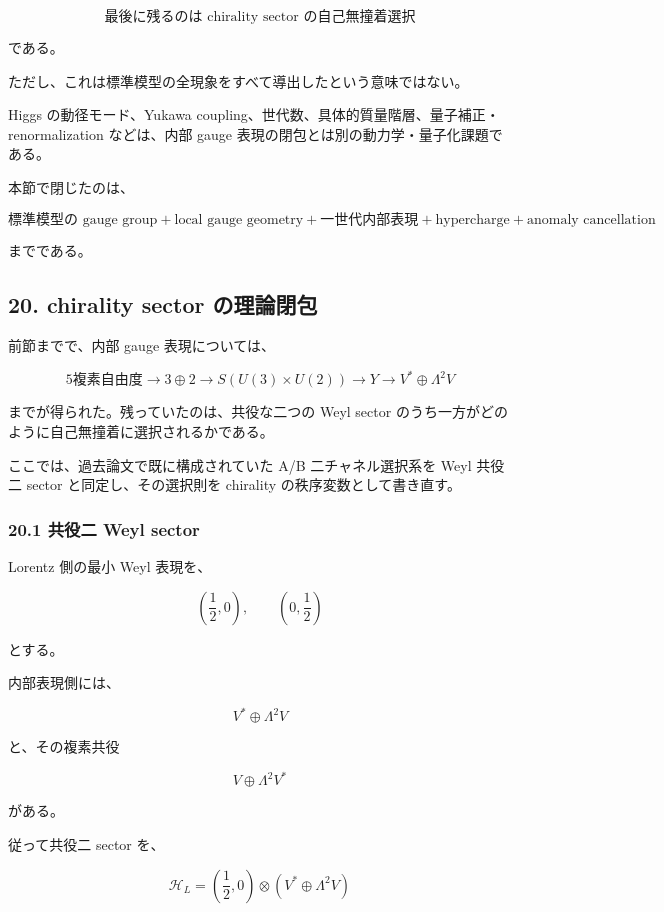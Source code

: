 \documentclass[
  a4paper,
]{ltjsarticle}
\begin{document}
\[
\boxed{
\text{最後に残るのは chirality sector の自己無撞着選択}
}
\tag{146}
\]

である。

ただし、これは標準模型の全現象をすべて導出したという意味ではない。

Higgs の動径モード、Yukawa
coupling、世代数、具体的質量階層、量子補正・renormalization などは、内部
gauge 表現の閉包とは別の動力学・量子化課題である。

本節で閉じたのは、

\[
\boxed{
\text{標準模型の gauge group}
+
\text{local gauge geometry}
+
\text{一世代内部表現}
+
\text{hypercharge}
+
\text{anomaly cancellation}
}
\tag{147}
\]

までである。

\subsection{20. chirality sector
の理論閉包}\label{chirality-sector-ux306eux7406ux8ad6ux9589ux5305}

前節までで、内部 gauge 表現については、

\[
5\text{複素自由度}
\to
3\oplus2
\to
S(U(3)\times U(2))
\to
Y
\to
V^*\oplus\Lambda^2V
\]

までが得られた。残っていたのは、共役な二つの Weyl sector
のうち一方がどのように自己無撞着に選択されるかである。

ここでは、過去論文で既に構成されていた A/B 二チャネル選択系を Weyl
共役二 sector と同定し、その選択則を chirality
の秩序変数として書き直す。

\subsubsection{20.1 共役二 Weyl
sector}\label{ux5171ux5f79ux4e8c-weyl-sector}

Lorentz 側の最小 Weyl 表現を、

\[
\left(\frac12,0\right),
\qquad
\left(0,\frac12\right)
\]

とする。

内部表現側には、

\[
V^*\oplus\Lambda^2V
\]

と、その複素共役

\[
V\oplus\Lambda^2V^*
\]

がある。

従って共役二 sector を、

\[
\boxed{
\mathcal H_L
=
\left(\frac12,0\right)
\otimes
\left(
V^*\oplus\Lambda^2V
\right)
}
\tag{148}
\]
\end{document}

